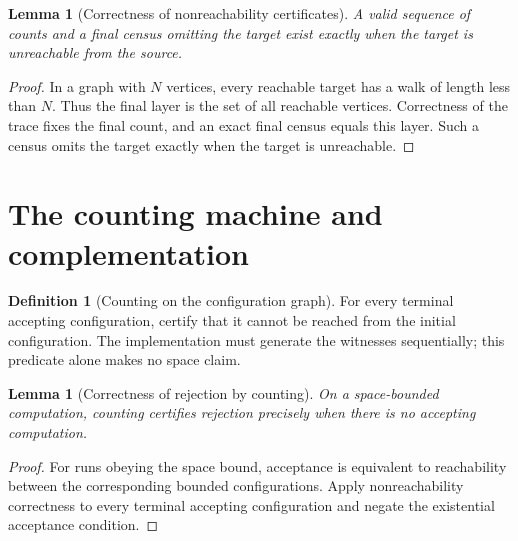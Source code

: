 \documentclass[11pt]{article}
\newtheorem{lemma}[theorem]{Lemma}
\theoremstyle{definition}
\newtheorem{definition}[theorem]{Definition}
\begin{document}
\begin{lemma}[Correctness of nonreachability certificates]\leavevmode
A valid sequence of counts and a final census omitting the target exist
exactly when the target is unreachable from the source.

\end{lemma}
\begin{proof}\leavevmode
In a graph with $N$ vertices, every reachable target has a walk of length less than $N$. Thus the final layer is the set of all reachable vertices. Correctness of the trace fixes the final count, and an exact final census equals this layer. Such a census omits the target exactly when the target is unreachable.\qedhere
\end{proof}

\section{The counting machine and complementation}

\begin{definition}[Counting on the configuration graph]\leavevmode
For every terminal accepting configuration, certify that it cannot be
reached from the initial configuration. The implementation must generate
the witnesses sequentially; this predicate alone makes no space claim.

\end{definition}

\begin{lemma}[Correctness of rejection by counting]\leavevmode
On a space-bounded computation, counting certifies rejection precisely when
there is no accepting computation.

\end{lemma}
\begin{proof}\leavevmode
For runs obeying the space bound, acceptance is equivalent to reachability between the corresponding bounded configurations. Apply nonreachability correctness to every terminal accepting configuration and negate the existential acceptance condition.\qedhere
\end{proof}
\end{document}
